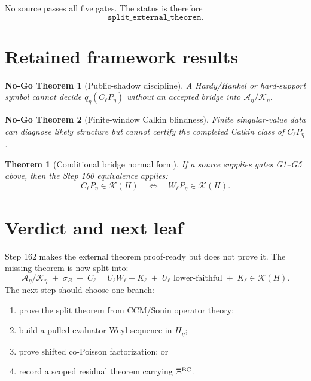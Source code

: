 \documentclass[11pt]{article}
\newtheorem{theorem}{Theorem}
\newtheorem{nogo}{No-Go Theorem}
\begin{document}
No source passes all five gates.  The status is therefore
\[
  \boxed{\texttt{split\_external\_theorem}.}
\]

\section{Retained framework results}

\begin{nogo}[Public-shadow discipline]
A Hardy/Hankel or hard-support symbol cannot decide \(q_\eta(C_\ell P_\eta)\)
without an accepted bridge into \(\mathcal A_\eta/\mathcal K_\eta\).
\end{nogo}

\begin{nogo}[Finite-window Calkin blindness]
Finite singular-value data can diagnose likely structure but cannot certify the
completed Calkin class of \(C_\ell P_\eta\).
\end{nogo}

\begin{theorem}[Conditional bridge normal form]
If a source supplies gates G1--G5 above, then the Step 160 equivalence applies:
\[
  C_\ell P_\eta\in\mathcal K(H)
  \quad\Longleftrightarrow\quad
  W_\ell P_\eta\in\mathcal K(H).
\]
\end{theorem}

\section{Verdict and next leaf}

Step 162 makes the external theorem proof-ready but does not prove it.  The
missing theorem is now split into:
\[
  \boxed{
  \mathcal A_\eta/\mathcal K_\eta
  \;+\;
  \sigma_B
  \;+\;
  C_\ell=U_\ell W_\ell+K_\ell
  \;+\;
  U_\ell\text{ lower-faithful}
  \;+\;
  K_\ell\in\mathcal K(H).
  }
\]
The next step should choose one branch:
\begin{enumerate}[label=(\alph*)]
  \item prove the split theorem from CCM/Sonin operator theory;
  \item build a pulled-evaluator Weyl sequence in \(H_\eta\);
  \item prove shifted co-Poisson factorization; or
  \item record a scoped residual theorem carrying \(\Xi^{\rm BC}\).
\end{enumerate}
\end{document}
